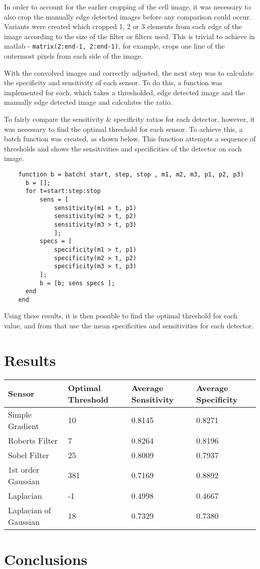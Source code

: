 \documentclass[12pt]{article}
\begin{document}
  In order to account for the earlier cropping of the cell image, it was necessary to also crop the manually edge detected images before any comparison could occur. Variants were created which cropped 1, 2 or 3 elements from each edge of the image according to the size of the filter or filters used. This is trivial to achieve in matlab - \texttt{matrix(2:end-1, 2:end-1)}, for example, crops one line of the outermost pixels from each side of the image.

  With the convolved images and correctly adjusted, the next step was to calculate the specificity and sensitivity of each sensor. To do this, a function was implemented for each, which takes a thresholded, edge detected image and the manually edge detected image and calculates the ratio.

  To fairly compare the sensitivity \& specificity ratios for each detector, however, it was necessary to find the optimal threshold for each sensor. To achieve this, a batch function was created, as shown below. This function attempts a sequence of thresholds and shows the sensitivities and specificities of the detector on each image.

  \small\begin{verbatim}
    function b = batch( start, step, stop , m1, m2, m3, p1, p2, p3)
      b = [];
      for t=start:step:stop
          sens = [
              sensitivity(m1 > t, p1)
              sensitivity(m2 > t, p2)
              sensitivity(m3 > t, p3)
              ];
          specs = [
              specificity(m1 > t, p1)
              specificity(m2 > t, p2)
              specificity(m3 > t, p3)
          ];
          b = [b; sens specs ];
      end
    end
  \end{verbatim}

  Using these results, it is then possible to find the optimal threshold for each value, and from that use the mean specificities and sensitivities for each detector.

  \section{Results}
  \begin{center}
    \begin{tabular}{|l|l|l|l|}
      \hline
      Sensor & Optimal Threshold & Average Sensitivity & Average Specificity\\
      \hline
      Simple Gradient & 10 & 0.8145 & 0.8271\\\hline
      Roberts Filter & 7 & 0.8264 & 0.8196\\\hline
      Sobel Filter & 25 & 0.8009 & 0.7937\\\hline
      1st order Gaussian & 381 & 0.7169 & 0.8892\\\hline
      Laplacian & -1 & 0.4998 & 0.4667\\\hline
      Laplacian of Gaussian & 18 & 0.7329 & 0.7380\\\hline
    \end{tabular}
  \end{center}
  \section{Conclusions}
\end{document}
